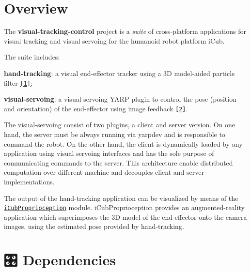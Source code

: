 \hypertarget{index_overview}{}\section{Overview}\label{index_overview}
The {\bfseries visual-\/tracking-\/control} project is a {\itshape suite} of cross-\/platform applications for visual tracking and visual servoing for the humanoid robot platform i\+Cub.

The suite includes\+:
\begin{DoxyItemize}
\item {\bfseries hand-\/tracking}\+: a visual end-\/effector tracker using a 3D model-\/aided particle filter \href{https://arxiv.org/abs/1703.04771}{\tt \mbox{[}1\mbox{]}};
\item {\bfseries visual-\/servoing}\+: a visual servoing {\ttfamily Y\+A\+RP} plugin to control the pose (position and orientation) of the end-\/effector using image feedback \href{https://arxiv.org/abs/1710.04465}{\tt \mbox{[}2\mbox{]}}.
\begin{DoxyItemize}
\item The {\ttfamily visual-\/servoing} consist of two plugins, a client and server version. On one hand, the server must be always running via {\ttfamily yarpdev} and is responsible to command the robot. On the other hand, the client is dynamically loaded by any application using visual servoing interfaces and has the sole purpose of communicating commands to the server. This architecture enable distributed computation over different machine and decouples client and server implementations.
\end{DoxyItemize}
\end{DoxyItemize}

The output of the hand-\/tracking application can be visualized by means of the \href{https://github.com/claudiofantacci/iCubProprioception}{\tt i\+Cub\+Proprioception} module. i\+Cub\+Proprioception provides an augmented-\/reality application which superimposes the 3D model of the end-\/effector onto the camera images, using the estimated pose provided by hand-\/tracking.

\href{https://robotology.github.io/visual-tracking-control/doxygen/doc/html/index.html}{\tt }\hypertarget{index_dependencies}{}\section{🎛 Dependencies}\label{index_dependencies}


